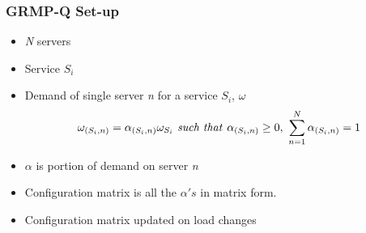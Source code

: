 \documentclass{beamer}
\begin{document}
\begin{frame}
	\frametitle{GRMP-Q Set-up}
	
	\begin{itemize}
		\item \emph{N} servers
		\item Service $S_i$
		\item Demand of single server  \emph{n} for a service $S_i$, $\omega$
		\begin{equation}
\omega_{(S_{i},n)} = \alpha_{(S_{i},n)} \omega_{S_i} \text{\emph{~such that~}} \alpha_{(S_{i},n)} \geq 0,~ \sum_{n=1}^{N} \alpha_{(S_{i},n)} = 1 \label{eq:1}
\end{equation}
	\item $\alpha$ is portion of demand on server \emph{n}
	\item Configuration matrix is all the  $\alpha 's$ in matrix form.
	\item Configuration matrix updated on load changes
	\end{itemize}
\end{frame}
\end{document}
